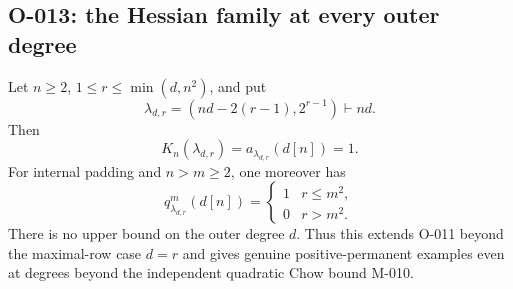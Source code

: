 \subsection{O-013: the Hessian family at every outer degree}

Let $n\geq2$, $1\leq r\leq\min(d,n^2)$, and put
\[
          \lambda_{d,r}=(nd-2(r-1),2^{r-1})\vdash nd.
\]
Then
\[
           K_n(\lambda_{d,r})=a_{\lambda_{d,r}}(d[n])=1.
                                                        \tag{O-013.1}
\]
For internal padding and $n>m\geq2$, one moreover has
\[
 q^m_{\lambda_{d,r}}(d[n])=
 \begin{cases}1&r\leq m^2,\\0&r>m^2.\end{cases}          \tag{O-013.2}
\]
There is no upper bound on the outer degree $d$. Thus this
extends O-011 beyond the maximal-row case $d=r$ and gives
genuine positive-permanent examples even at degrees beyond
the independent quadratic Chow bound M-010.

